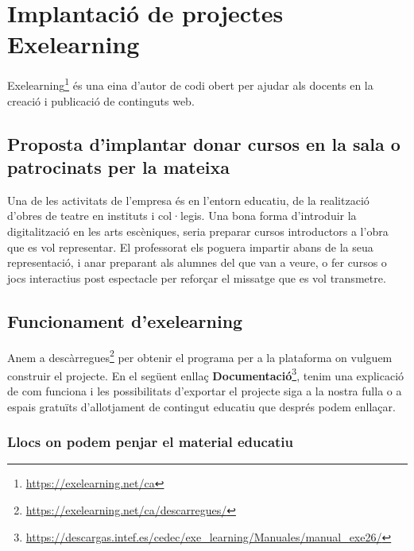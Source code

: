 \documentclass[
  10pt,
]{krantz}
\DeclareRobustCommand{\href}[2]{#2\footnote{\url{#1}}}
\begin{document}
\hypertarget{implantaciuxf3-de-projectes-exelearning}{%
\chapter{Implantació de projectes Exelearning}\label{implantaciuxf3-de-projectes-exelearning}}

\href{https://exelearning.net/ca}{Exelearning} és una eina d'autor de codi obert per ajudar als docents en la creació i publicació de continguts web.

\hypertarget{proposta-dimplantar-donar-cursos-en-la-sala-o-patrocinats-per-la-mateixa}{%
\section{Proposta d'implantar donar cursos en la sala o patrocinats per la mateixa}\label{proposta-dimplantar-donar-cursos-en-la-sala-o-patrocinats-per-la-mateixa}}

Una de les activitats de l'empresa és en l'entorn educatiu, de la realització d'obres de teatre en instituts i col·legis. Una bona forma d'introduir la digitalització en les arts escèniques, seria preparar cursos introductors a l'obra que es vol representar. El professorat els poguera impartir abans de la seua representació, i anar preparant als alumnes del que van a veure, o fer cursos o jocs interactius post espectacle per reforçar el missatge que es vol transmetre.

\hypertarget{funcionament-dexelearning}{%
\section{Funcionament d'exelearning}\label{funcionament-dexelearning}}

Anem a \href{https://exelearning.net/ca/descarregues/}{descàrregues} per obtenir el programa per a la plataforma on vulguem construir el projecte. En el següent enllaç \href{https://descargas.intef.es/cedec/exe_learning/Manuales/manual_exe26/}{\textbf{Documentació}}, tenim una explicació de com funciona i les possibilitats d'exportar el projecte siga a la nostra fulla o a espais gratuïts d'allotjament de contingut educatiu que després podem enllaçar.

\hypertarget{llocs-on-podem-penjar-el-material-educatiu}{%
\subsection{Llocs on podem penjar el material educatiu}\label{llocs-on-podem-penjar-el-material-educatiu}}
\end{document}
